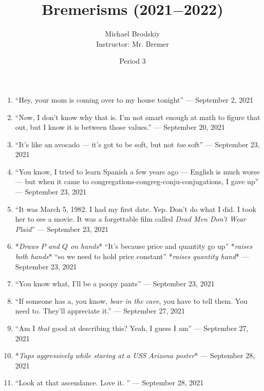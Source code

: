 \documentclass[12pt]{article}
\title{Bremerisms (2021$-$2022)}
\date{Period 3}
\author{Michael Brodskiy\\ \small Instructor: Mr. Bremer}
\begin{document}
\maketitle

\begin{enumerate}

  \item “Hey, your mom is coming over to my house tonight” — September 2, 2021

  \item “Now, I don't know why that is. I'm not smart enough at math to figure that out, but I know it is between those values.” — September 20, 2021

  \item ``It's like an avocado — it's got to be soft, but not \textit{too} soft'' — September 23, 2021

    \item ``You know, I tried to learn Spanish a few years ago — English is much worse — but when it came to congregations-congreg-conju-conjugations, I gave up'' — September 23, 2021

    \item ``It was March 5, 1982. I had my first date. Yep. Don't do what I did. I took her to see a movie. It was a forgettable film called \textit{Dead Men Don't Wear Plaid}'' — September 23, 2021

    \item *\textit{Draws $P$ and $Q$ on hands}* ``It's because price and quantity go up'' *\textit{raises both hands}* ``so we need to hold price constant'' *\textit{raises quantity hand}* — September 23, 2021

      \item ``You know what, I'll be a poopy pants'' — September 23, 2021

      \item “If someone has a, you know, \textit{bear in the cave}, you have to tell them. You need to. They'll appreciate it.” — September 27, 2021

      \item “Am I \textit{that} good at describing this? Yeah, I guess I am” — September 27, 2021

      \item *\textit{Taps aggressively while staring at a USS Arizona poster}* — September 28, 2021

      \item “Look at that ascendance. Love it. ” — September 28, 2021


\end{enumerate}
\end{document}
